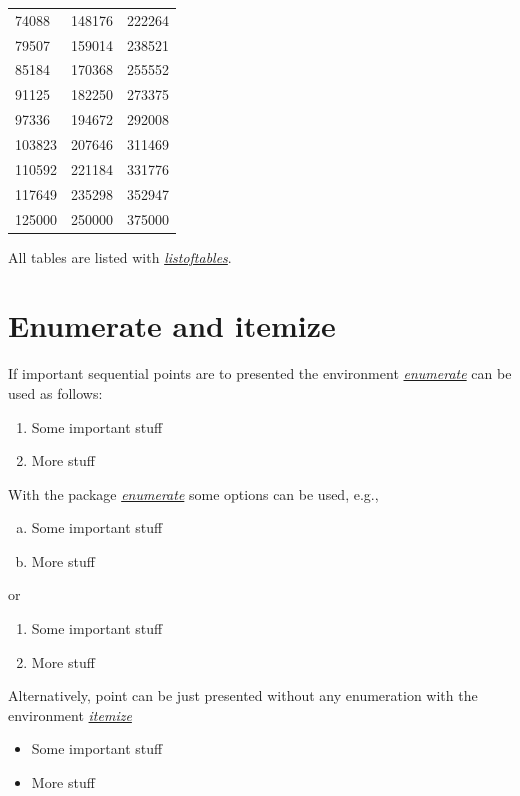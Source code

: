 \documentclass[a4paper]{book}
\newcommand{\imp}[1]{\underline{\textit{#1}}}
\begin{document}
\begin{center}
\begin{longtable}{l|l|l}
 74088 & 148176 & 222264 \\
 79507 & 159014 & 238521 \\
 85184 & 170368 & 255552 \\
 91125 & 182250 & 273375 \\
 97336 & 194672 & 292008 \\
 103823 & 207646 & 311469 \\
 110592 & 221184 & 331776 \\
 117649 & 235298 & 352947 \\
 125000 & 250000 & 375000 \\
\end{longtable}
\end{center}

All tables are listed with \imp{listoftables}.


\section{Enumerate and itemize}

If important sequential points are to presented the environment \imp{enumerate} can be used as follows:
\begin{enumerate}
\item
	Some important stuff
\item
	More stuff
\end{enumerate}
With the package \imp{enumerate} some options can be used, e.g.,
\begin{enumerate}[a)]
\item
	Some important stuff
\item
	More stuff
\end{enumerate}
or 
\begin{enumerate}[~~~1)]
\item
	Some important stuff
\item
	More stuff
\end{enumerate}

Alternatively, point can be just presented without any enumeration with the environment \imp{itemize}
\begin{itemize}
\item
	Some important stuff
\item
	More stuff
\end{itemize}

\end{document}
